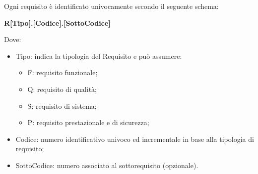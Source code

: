 
    Ogni requisito è identificato univocamente secondo il seguente schema:
        \begin{center}
            \large{\textbf{R[Tipo].[Codice].[SottoCodice]}}
        \end{center}
    Dove:
    \begin{itemize}
        \item Tipo: indica la tipologia del Requisito e può assumere: \begin{itemize}
            \item F: requisito funzionale;
            \item Q: requisito di qualità;
            \item S: requisito di sistema;
            \item P: requisito prestazionale e di sicurezza;
        \end{itemize}

        \item Codice: numero identificativo univoco ed incrementale in base alla tipologia di requisito;
        \item SottoCodice: numero associato al sottorequisito (opzionale).
      
    \end{itemize}
 
